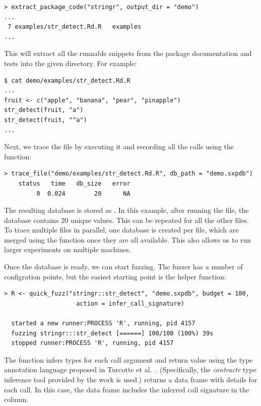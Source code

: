 \documentclass[sigplan,nonacm,anonymous,review]{acmart}
\begin{document}
\begin{lstlisting}
> extract_package_code("stringr", output_dir = "demo")
...
 7 examples/str_detect.Rd.R   examples
...
\end{lstlisting}

This will extract all the runnable snippets from the package documentation and tests into the given directory.
For example:

\begin{lstlisting}
$ cat demo/examples/str_detect.Rd.R
...
fruit <- c("apple", "banana", "pear", "pinapple")
str_detect(fruit, "a")
str_detect(fruit, "^a")
...
\end{lstlisting}

Next, we trace the file by executing it and recording all the calls using the  function:

\begin{lstlisting}
> trace_file("demo/examples/str_detect.Rd.R", db_path = "demo.sxpdb")
    status   time   db_size   error
         0  0.024        20      NA
\end{lstlisting}

The resulting database is stored as . 
In this example, after running the  file, the database contains 20 unique values. 
This can be repeated for all the other files. 
To trace multiple files in parallel, one database is created per file, which are merged using the  function once they are all available.
This also allows us to run larger experiments on multiple machines.

Once the database is ready, we can start fuzzing.
The fuzzer has a number of configration points, but the easiest starting point is the  helper function:

\begin{lstlisting}
> R <- quick_fuzz("stringr::str_detect", "demo.sxpdb", budget = 100, 
                    action = infer_call_signature)

  started a new runner:PROCESS 'R', running, pid 4157
  fuzzing stringr:::str_detect [======] 100/100 (100%) 39s
  stopped runner:PROCESS 'R', running, pid 4157
\end{lstlisting}

The  function infers types for each call argument and return value using the type annotation language proposed in Turcotte et al.~\cite{turcotte2020designing}.
(Specifically, the \emph{contractr} type inference tool provided by the work is used.)
 returns a data frame with details for each call.
In this case, the data frame includes the inferred call signature in the  column. %
\end{document}
